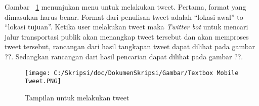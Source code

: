 Gambar ~\ref{fig:Textbox Mobile Tweet} menunjukan menu untuk melakukan tweet. Pertama, format yang dimasukan harus benar. Format dari penulisan tweet adalah "`lokasi awal"' to "`lokasi tujuan"'. Ketika user melakukan tweet maka \textit{Twitter bot} untuk mencari jalur transportasi publik akan menangkap tweet tersebut dan akan memproses tweet tersebut, rancangan dari hasil tangkapan tweet dapat dilihat pada gambar ??. Sedangkan rancangan dari hasil pencarian dapat dilihat pada gambar ??.

\begin{figure}[hp]
	\centering
		\texttt{[image: C:/Skripsi/doc/DokumenSkripsi/Gambar/Textbox Mobile Tweet.PNG]}
	\caption{Tampilan untuk melakukan tweet}
	\label{fig:Textbox Mobile Tweet}
\end{figure}
\fi



